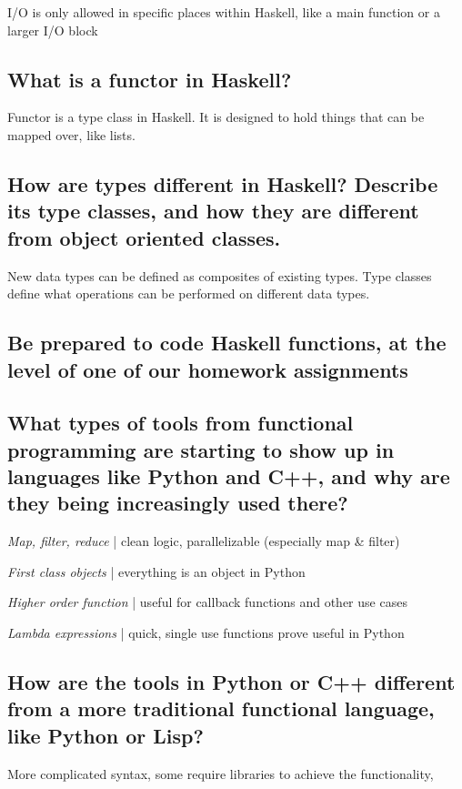 \documentclass{article}
\newcommand{\define}[1]{\noindent\textit{#1} | }
\begin{document}
I/O is only allowed in specific places within Haskell, like a main function or a larger I/O block

\subsection{What is a functor in Haskell?}

Functor is a type class in Haskell. It is designed to hold things that can be mapped over, like lists.

\subsection{How are types different in Haskell? Describe its type classes, and how they are different from object oriented classes.}

New data types can be defined as composites of existing types. Type classes define what operations can be performed on different data types.

\subsection{Be prepared to code Haskell functions, at the level of one of our homework assignments}

\subsection{What types of tools from functional programming are starting to show up in languages like Python and C++, and why are they being increasingly used there?}

\define{Map, filter, reduce} clean logic, parallelizable (especially map \& filter)

\define{First class objects} everything is an object in Python

\define{Higher order function} useful for callback functions and other use cases

\define{Lambda expressions} quick, single use functions prove useful in Python

\subsection{How are the tools in Python or C++ different from a more traditional functional language, like Python or Lisp?}

More complicated syntax, some require libraries to achieve the functionality, 
\end{document}
